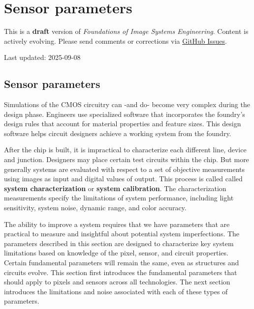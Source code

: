 \documentclass[
  letterpaper,
]{book}
\begin{document}
\chapter{Sensor parameters}\label{sec-system-parameters}

\begin{tcolorbox}[enhanced jigsaw, opacityback=0, breakable, coltitle=black, leftrule=.75mm, left=2mm, colframe=quarto-callout-warning-color-frame, opacitybacktitle=0.6, bottomtitle=1mm, bottomrule=.15mm, toprule=.15mm, title=\textcolor{quarto-callout-warning-color}{\faExclamationTriangle}\hspace{0.5em}{Work in Progress}, titlerule=0mm, toptitle=1mm, colback=white, rightrule=.15mm, colbacktitle=quarto-callout-warning-color!10!white, arc=.35mm]

This is a \textbf{draft} version of \emph{Foundations of Image Systems
Engineering}. Content is actively evolving. Please send comments or
corrections via \href{https://github.com/wandell/FISE-git/issues}{GitHub
Issues}.

Last updated: 2025-09-08

\end{tcolorbox}

\section{Sensor parameters}\label{sec-system-parameters-overview}

Simulations of the CMOS circuitry can -and do- become very complex
during the design phase. Engineers use specialized software that
incorporates the foundry's design rules that account for material
properties and feature sizes. This design software helps circuit
designers achieve a working system from the foundry.

After the chip is built, it is impractical to characterize each
different line, device and junction. Designers may place certain test
circuits within the chip. But more generally systems are evaluated with
respect to a set of objective measurements using images as input and
digital values of output. This process is called called \textbf{system
characterization} or \textbf{system calibration}. The characterization
measurements specify the limitations of system performance, including
light sensitivity, system noise, dynamic range, and color accuracy.

The ability to improve a system requires that we have parameters that
are practical to measure and insightful about potential system
imperfections. The parameters described in this section are designed to
characterize key system limitations based on knowledge of the pixel,
sensor, and circuit properties. Certain fundamental parameters will
remain the same, even as structures and circuits evolve. This section
first introduces the fundamental parameters that should apply to pixels
and sensors across all technologies. The next section introduces the
limitations and noise associated with each of these types of parameters.
\end{document}
